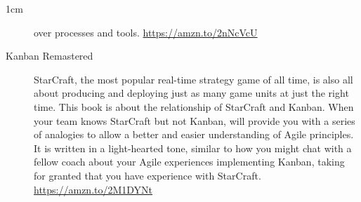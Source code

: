 \begin{setlength}{\leftmargin}{1cm}
\begin{description}
over processes and tools. \url{https://amzn.to/2nNcVcU}

\item[Kanban Remastered] StarCraft, the most popular real-time strategy game of all time, is also all about producing and deploying just as many game units at just the right time. This book is about the relationship of StarCraft and Kanban. When your team knows StarCraft but not Kanban, \ifxetex\else \citep{kanban-remastered}\fi will provide you with a series of analogies to allow a better and easier understanding of Agile principles. It is written in a light-hearted tone, similar to how you might chat with a fellow coach about your Agile experiences implementing Kanban, taking for granted that you have experience with StarCraft. \url{https://amzn.to/2M1DYNt}

\end{description}
\end{setlength}